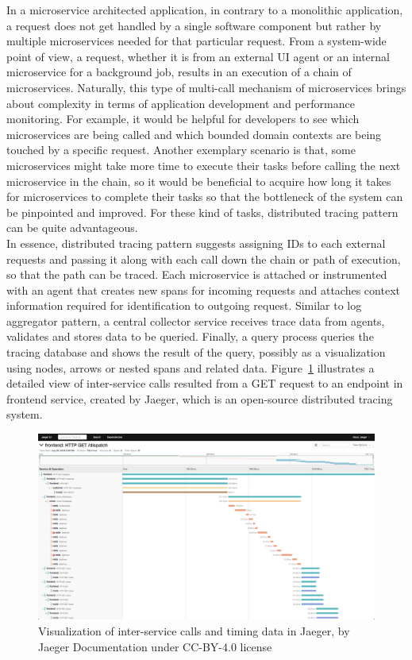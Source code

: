 \documentclass{Configuration_Files/PoliMi3i_thesis}
\begin{document}
In a microservice architected application, in contrary to a monolithic application, a request does not get handled by a single software component but rather by multiple microservices needed for that particular request.
From a system-wide point of view, a request, whether it is from an external UI agent or an internal microservice for a background job, results in an execution of a chain of microservices.
Naturally, this type of multi-call mechanism of microservices brings about complexity in terms of application development and performance monitoring.
For example, it would be helpful for developers to see which microservices are being called and which bounded domain contexts are being touched by a specific request.
Another exemplary scenario is that, some microservices might take more time to execute their tasks before calling the next microservice in the chain, so it would be beneficial to acquire how long it takes for microservices to complete their tasks so that the bottleneck of the system can be pinpointed and improved.
For these kind of tasks, distributed tracing pattern can be quite advantageous.
\\
In essence, distributed tracing pattern suggests assigning IDs to each external requests and passing it along with each call down the chain or path of execution, so that the path can be traced.
Each microservice is attached or instrumented with an agent that creates new spans for incoming requests and attaches context information required for identification to outgoing request.
Similar to log aggregator pattern, a central collector service receives trace data from agents, validates and stores data to be queried.
Finally, a query process queries the tracing database and shows the result of the query, possibly as a visualization using nodes, arrows or nested spans and related data.
Figure~\ref{fig:jaeger_trace} illustrates a detailed view of inter-service calls resulted from a GET request to an endpoint in frontend service, created by Jaeger, which is an open-source distributed tracing system.

\begin{figure}[H]
\centering
\includegraphics[width=1.0\textwidth]{myImages/trace-detail-ss.png}
\caption{Visualization of inter-service calls and timing data in Jaeger, by Jaeger Documentation under CC-BY-4.0 license}
\label{fig:jaeger_trace}
\end{figure}
\end{document}

